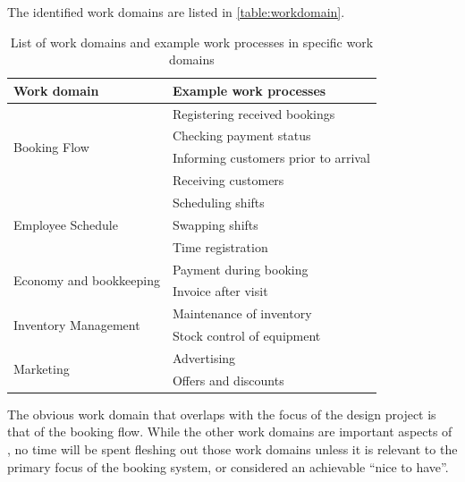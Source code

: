 The identified work domains are listed in \autoref{table:workdomain}.

\begin{table}[H]
    \centering
\begin{tabular}{|l|l|}
        \hline
        Work domain & Example work processes \\ \hline
        \multirow{4}{*}{Booking Flow} 
            & Registering received bookings \\
            & Checking payment status \\
            & Informing customers prior to arrival \\
            & Receiving customers \\
        \hline
        \multirow{3}{*}{Employee Schedule} 
            & Scheduling shifts \\
            & Swapping shifts \\
            & Time registration \\
        \hline
        \multirow{2}{*}{Economy and bookkeeping} 
            & Payment during booking \\
            & Invoice after visit \\
        \hline
        \multirow{2}{*}{Inventory Management} 
            & Maintenance of inventory \\
            & Stock control of equipment \\
        \hline
        \multirow{2}{*}{Marketing} 
            & Advertising \\
            & Offers and discounts \\
        \hline
\end{tabular}
\caption{List of work domains and example work processes in specific work domains}
\label{table:workdomain}
\end{table}

The obvious work domain that overlaps with the focus of the design project is
that of the booking flow. While the other work domains are important aspects of
\gomonkey{}, no time will be spent fleshing out those work domains unless it is
relevant to the primary focus of the booking system, or considered an achievable
``nice to have''.

